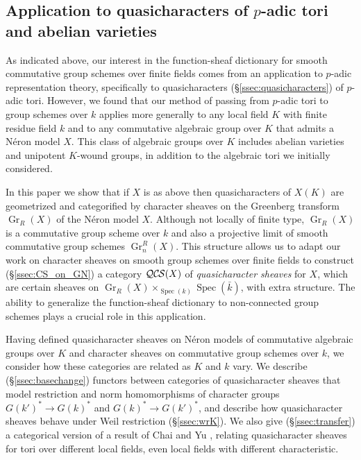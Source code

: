 \documentclass[10pt]{amsart}
\theoremstyle{plain}
\theoremstyle{definition}
\newcommand{\bFq}{\bar{k}}
\newcommand{\Fq}{k}
\DeclareMathOperator{\Gr}{Gr}
\newcommand{\Spec}[1]{{\operatorname{Spec}(#1)}}
\newcommand{\QCS}{{\mathcal{QC\hskip-0.8pt S}}}
\begin{document}
\subsection*{Application to quasicharacters of \texorpdfstring{$p$}{p}-adic tori and abelian varieties}
As indicated above, our interest in the function-sheaf dictionary for smooth commutative group schemes
over finite fields comes from an application to $p$-adic representation theory,
specifically to quasicharacters (\S\ref{ssec:quasicharacters}) of $p$-adic tori.
However, we found that our method of passing from $p$-adic tori to group schemes over $\Fq$ applies more generally to
any local field $K$ with finite residue field $\Fq$ and to any commutative algebraic group over $K$ that admits a N\'eron model $X$.
This class of algebraic groups over $K$ includes abelian varieties and unipotent $K$-wound groups,
in addition to the algebraic tori we initially considered.

In this paper we show that if $X$ is as above then quasicharacters of $X(K)$ are geometrized and categorified by character sheaves on the
Greenberg transform $\Gr_R(X)$ of the N\'eron model $X$.
Although not locally of finite type, $\Gr_R(X)$ is a commutative group scheme over $\Fq$ and also a projective limit
of smooth commutative group schemes $\Gr^R_n(X)$.
This structure allows us to adapt our work on character sheaves on smooth group schemes over
finite fields to construct (\S\ref{ssec:CS_on_GN}) a category $\QCS(X)$
of {\it quasicharacter sheaves} for $X$, which are certain sheaves on $\Gr_R(X)\times_{\Spec{\Fq}} \Spec{\bFq}$, with extra structure.
The ability to generalize the function-sheaf dictionary to non-connected group schemes plays a crucial role in this application.

Having defined quasicharacter sheaves on N\'eron models of commutative algebraic groups over $K$
and character sheaves on commutative group schemes over $\Fq$, we consider how
these categories are related as $K$ and $\Fq$ vary.  We describe (\S\ref{ssec:basechange}) functors between categories
of quasicharacter sheaves that model restriction and norm homomorphisms of character groups $G(k')^* \to G(k)^*$ and $G(k)^* \to G(k')^*$,
and describe how quasicharacter sheaves behave under Weil restriction (\S\ref{ssec:wrK}).  We also give (\S\ref{ssec:transfer})
a categorical version of a result of Chai and Yu \cite{chai-yu:01a},
relating quasicharacter sheaves for tori over different local fields, even local fields
with different characteristic.
\end{document}
